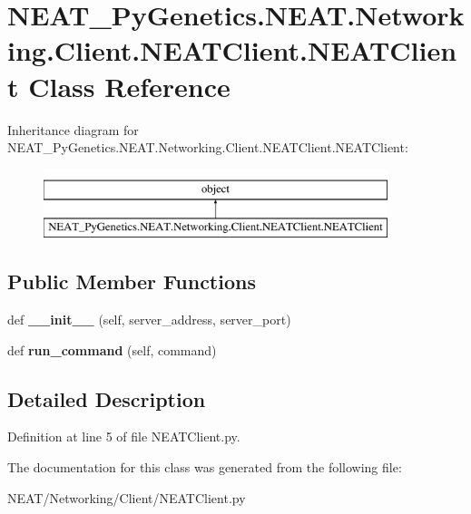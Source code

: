 \hypertarget{class_n_e_a_t___py_genetics_1_1_n_e_a_t_1_1_networking_1_1_client_1_1_n_e_a_t_client_1_1_n_e_a_t_client}{}\section{N\+E\+A\+T\+\_\+\+Py\+Genetics.\+N\+E\+A\+T.\+Networking.\+Client.\+N\+E\+A\+T\+Client.\+N\+E\+A\+T\+Client Class Reference}
\label{class_n_e_a_t___py_genetics_1_1_n_e_a_t_1_1_networking_1_1_client_1_1_n_e_a_t_client_1_1_n_e_a_t_client}
Inheritance diagram for N\+E\+A\+T\+\_\+\+Py\+Genetics.\+N\+E\+A\+T.\+Networking.\+Client.\+N\+E\+A\+T\+Client.\+N\+E\+A\+T\+Client\+:\begin{figure}[H]
\begin{center}
\leavevmode
\includegraphics[height=2.000000cm]{class_n_e_a_t___py_genetics_1_1_n_e_a_t_1_1_networking_1_1_client_1_1_n_e_a_t_client_1_1_n_e_a_t_client}
\end{center}
\end{figure}
\subsection*{Public Member Functions}
\begin{DoxyCompactItemize}
\item 
def {\bfseries \+\_\+\+\_\+init\+\_\+\+\_\+} (self, server\+\_\+address, server\+\_\+port)\hypertarget{class_n_e_a_t___py_genetics_1_1_n_e_a_t_1_1_networking_1_1_client_1_1_n_e_a_t_client_1_1_n_e_a_t_client_a9e84283e9dab07424cbbef8d966fd74b}{}\label{class_n_e_a_t___py_genetics_1_1_n_e_a_t_1_1_networking_1_1_client_1_1_n_e_a_t_client_1_1_n_e_a_t_client_a9e84283e9dab07424cbbef8d966fd74b}

\item 
def {\bfseries run\+\_\+command} (self, command)\hypertarget{class_n_e_a_t___py_genetics_1_1_n_e_a_t_1_1_networking_1_1_client_1_1_n_e_a_t_client_1_1_n_e_a_t_client_a58156abc06c16b0f2399219655c7321c}{}\label{class_n_e_a_t___py_genetics_1_1_n_e_a_t_1_1_networking_1_1_client_1_1_n_e_a_t_client_1_1_n_e_a_t_client_a58156abc06c16b0f2399219655c7321c}

\end{DoxyCompactItemize}


\subsection{Detailed Description}


Definition at line 5 of file N\+E\+A\+T\+Client.\+py.



The documentation for this class was generated from the following file\+:\begin{DoxyCompactItemize}
\item 
N\+E\+A\+T/\+Networking/\+Client/N\+E\+A\+T\+Client.\+py\end{DoxyCompactItemize}
